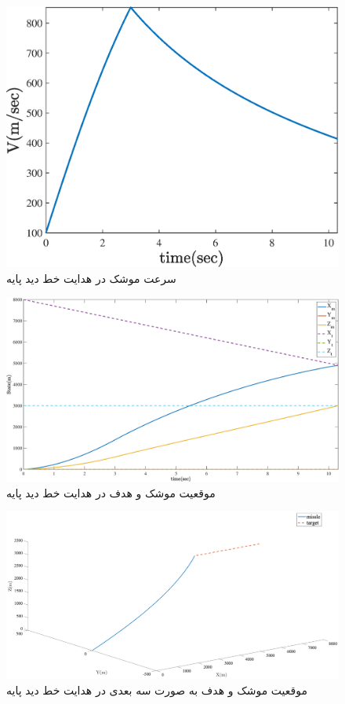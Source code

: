 \begin{figure}[H]
	\centering
	\includegraphics[width=.75\linewidth]{../Figure/c/missle_V}
	\caption{سرعت موشک  در هدایت خط دید پایه}
\end{figure}

\begin{figure}[H]
	\centering
	\includegraphics[width=\linewidth]{../Figure/c/missle_vs_target_state}
	\caption{موقعیت موشک و هدف  در هدایت خط دید پایه}
\end{figure}

\begin{figure}[H]
	\centering
	\includegraphics[width=\linewidth]{../Figure/c/3DoF_missle_vs_target_state}
	\caption{موقعیت موشک و هدف به صورت سه بعدی  در هدایت خط دید پایه}
\end{figure}

